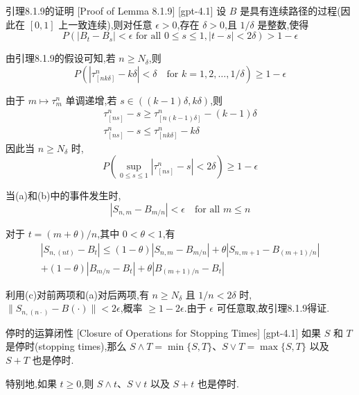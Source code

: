 \documentclass[UTF8]{ctexart}
\begin{document}
    \begin{prf}
        {引理8.1.9的证明}
        [Proof of Lemma 8.1.9]
        [gpt-4.1]
        设 $B$ 是具有连续路径的过程(因此在 $[0,1]$ 上一致连续),则对任意 $\epsilon > 0$,存在 $\delta > 0$,且 $1/\delta$ 是整数,使得
\[
P( | B_{t} - B_{s} | < \epsilon \text{ for all } 0 \leq s \leq 1, |t - s| < 2\delta ) > 1 - \epsilon
\]

由引理8.1.9的假设可知,若 $n \geq N_{\delta}$,则
\[
P( | \tau_{[nk\delta]}^{n} - k\delta | < \delta \quad \text{for } k = 1, 2, \dots, 1/\delta ) \geq 1 - \epsilon
\]

由于 $m \mapsto \tau_{m}^{n}$ 单调递增,若 $s \in ((k-1)\delta, k\delta)$,则
\[
\begin{array}{ll}
    \tau_{[ns]}^{n} - s \geq \tau_{[n(k-1)\delta]}^{n} - (k-1)\delta \\
    \tau_{[ns]}^{n} - s \leq \tau_{[nk\delta]}^{n} - k\delta
\end{array}
\]
因此当 $n \geq N_{\delta}$ 时,
\[
P \left( \sup_{0 \leq s \leq 1} | \tau_{[ns]}^{n} - s | < 2\delta \right) \geq 1 - \epsilon
\]

当(a)和(b)中的事件发生时,
\[
| S_{n,m} - B_{m/n} | < \epsilon \quad \text{for all } m \leq n
\]

对于 $t = (m + \theta)/n$,其中 $0 < \theta < 1$,有
\[
\begin{array}{c}
    | S_{n, (nt)} - B_{t} | \leq (1-\theta) | S_{n,m} - B_{m/n} | + \theta | S_{n,m+1} - B_{(m+1)/n} | \\
    + (1-\theta) | B_{m/n} - B_{t} | + \theta | B_{(m+1)/n} - B_{t} |
\end{array}
\]

利用(c)对前两项和(a)对后两项,有 $n \geq N_{\delta}$ 且 $1/n < 2\delta$ 时,$\| S_{n, (n \cdot)} - B(\cdot) \| < 2\epsilon$,概率 $\geq 1 - 2\epsilon$.由于 $\epsilon$ 可任意取,故引理8.1.9得证.

    \end{prf}
    
    
    
    \begin{ppt}
        {停时的运算闭性}
        [Closure of Operations for Stopping Times]
        [gpt-4.1]
        如果 $S$ 和 $T$ 是停时(stopping times),那么 $S \wedge T = \min\{S, T\}$、$S \vee T = \max\{S, T\}$ 以及 $S + T$ 也是停时.

特别地,如果 $t \geq 0$,则 $S \wedge t$、$S \vee t$ 以及 $S + t$ 也是停时.
    \end{ppt}
    
\end{document}
